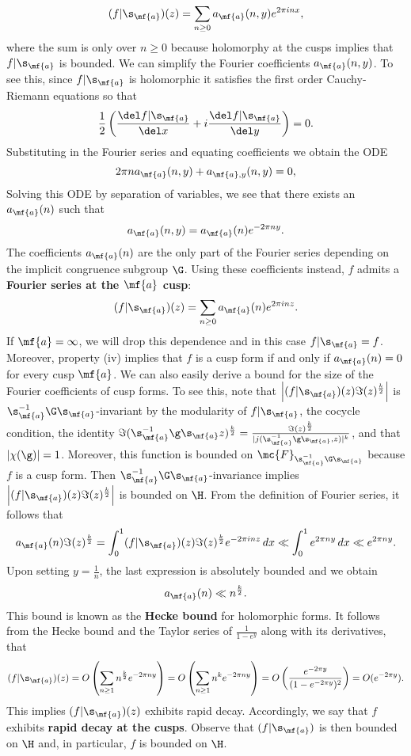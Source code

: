     \[
      (f|\s_{\mf{a}})(z) = \sum_{n \ge 0}a_{\mf{a}}(n,y)e^{2\pi inx},
    \]
    where the sum is only over $n \ge 0$ because holomorphy at the cusps implies that $f|\s_{\mf{a}}$ is bounded. We can simplify the Fourier coefficients $a_{\mf{a}}(n,y)$. To see this, since $f|\s_{\mf{a}}$ is holomorphic it satisfies the first order Cauchy-Riemann equations so that
    \[
      \frac{1}{2}\left(\frac{\del f|\s_{\mf{a}}}{\del x}+i\frac{\del f|\s_{\mf{a}}}{\del y}\right) = 0.
    \]
    Substituting in the Fourier series and equating coefficients we obtain the ODE
    \[
      2\pi na_{\mf{a}}(n,y)+a_{\mf{a},y}(n,y) = 0,
    \]
    Solving this ODE by separation of variables, we see that there exists an $a_{\mf{a}}(n)$ such that
    \[
      a_{\mf{a}}(n,y) = a_{\mf{a}}(n)e^{-2\pi ny}.
    \]
    The coefficients $a_{\mf{a}}(n)$ are the only part of the Fourier series depending on the implicit congruence subgroup $\G$. Using these coefficients instead, $f$ admits a \textbf{Fourier series at the $\mf{a}$ cusp}:
    \[
      (f|\s_{\mf{a}})(z) = \sum_{n \ge 0}a_{\mf{a}}(n)e^{2\pi inz}.
    \]
    If $\mf{a} = \infty$, we will drop this dependence and in this case $f|\s_{\mf{a}} = f$. Moreover, property (iv) implies that $f$ is a cusp form if and only if $a_{\mf{a}}(n) = 0$ for every cusp $\mf{a}$. We can also easily derive a bound for the size of the Fourier coefficients of cusp forms. To see this, note that $\left|(f|\s_{\mf{a}})(z)\Im(z)^{\frac{k}{2}}\right|$ is $\s_{\mf{a}}^{-1}\G\s_{\mf{a}}$-invariant by the modularity of $f|\s_{\mf{a}}$, the cocycle condition, the identity $\Im(\s_{\mf{a}}^{-1}\g\s_{\mf{a}}z)^{\frac{k}{2}} = \frac{\Im(z)^{\frac{k}{2}}}{|j(\s_{\mf{a}}^{-1}\g\s_{\mf{a}},z)|^{k}}$, and that $|\chi(\g)| = 1$. Moreover, this function is bounded on $\mc{F}_{\s_{\mf{a}}^{-1}\G\s_{\mf{a}}}$ because $f$ is a cusp form. Then $\s_{\mf{a}}^{-1}\G\s_{\mf{a}}$-invariance implies $\left|(f|\s_{\mf{a}})(z)\Im(z)^{\frac{k}{2}}\right|$ is bounded on $\H$. From the definition of Fourier series, it follows that
    \[
      a_{\mf{a}}(n)\Im(z)^{\frac{k}{2}} = \int_{0}^{1}(f|\s_{\mf{a}})(z)\Im(z)^{\frac{k}{2}}e^{-2\pi inz}\,dx \ll \int_{0}^{1}e^{2\pi ny}\,dx \ll e^{2\pi ny}.
    \]
    Upon setting $y = \frac{1}{n}$, the last expression is absolutely bounded and we obtain
    \[
      a_{\mf{a}}(n) \ll n^{\frac{k}{2}}.
    \]
    This bound is known as the \textbf{Hecke bound} for holomorphic forms. It follows from the Hecke bound and the Taylor series of $\frac{1}{1-e^{y}}$ along with its derivatives, that
    \[
      (f|\s_{\mf{a}})(z) = O\left(\sum_{n \ge 1}n^{\frac{k}{2}}e^{-2\pi ny}\right) = O\left(\sum_{n \ge 1}n^{k}e^{-2\pi ny}\right) = O\left(\frac{e^{-2\pi y}}{(1-e^{-2\pi y})^{2}}\right) = O(e^{-2\pi y}).
    \]
    This implies $(f|\s_{\mf{a}})(z)$ exhibits rapid decay. Accordingly, we say that $f$ exhibits \textbf{rapid decay at the cusps}. Observe that $(f|\s_{\mf{a}})$ is then bounded on $\H$ and, in particular, $f$ is bounded on $\H$.
